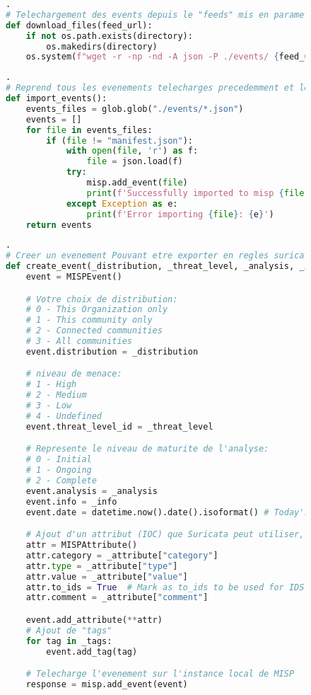 \begin{figure}[h]%
    \center%
\begin{lstlisting}[language=Python].
# Telechargement des events depuis le "feeds" mis en parametre dans un dossier local
def download_files(feed_url):
    if not os.path.exists(directory):
        os.makedirs(directory)
    os.system(f"wget -r -np -nd -A json -P ./events/ {feed_url}")
\end{lstlisting}
\end{figure}

\begin{figure}[h]%
    \center%
\begin{lstlisting}[language=Python].
# Reprend tous les evenements telecharges precedemment et les integre dans l'instance locale de MISP.
def import_events():
    events_files = glob.glob("./events/*.json")
    events = []
    for file in events_files:
        if (file != "manifest.json"):
            with open(file, 'r') as f:
                file = json.load(f)
            try:
                misp.add_event(file)
                print(f'Successfully imported to misp {file}')
            except Exception as e:
                print(f'Error importing {file}: {e}')
    return events
\end{lstlisting}
\end{figure}

\newpage

\begin{figure}[h]%
    \center%
\begin{lstlisting}[language=Python].
# Creer un evenement Pouvant etre exporter en regles suricata
def create_event(_distribution, _threat_level, _analysis, _info, _attribute, _tags):
    event = MISPEvent()

    # Votre choix de distribution:
    # 0 - This Organization only
    # 1 - This community only
    # 2 - Connected communities
    # 3 - All communities
    event.distribution = _distribution

    # niveau de menace:
    # 1 - High
    # 2 - Medium
    # 3 - Low
    # 4 - Undefined
    event.threat_level_id = _threat_level

    # Represente le niveau de maturite de l'analyse:
    # 0 - Initial
    # 1 - Ongoing
    # 2 - Complete
    event.analysis = _analysis
    event.info = _info
    event.date = datetime.now().date().isoformat() # Today's date

    # Ajout d'un attribut (IOC) que Suricata peut utiliser, tel qu'un domaine
    attr = MISPAttribute()
    attr.category = _attribute["category"]
    attr.type = _attribute["type"]
    attr.value = _attribute["value"]
    attr.to_ids = True  # Mark as to_ids to be used for IDS export
    attr.comment = _attribute["comment"]

    event.add_attribute(**attr)
    # Ajout de "tags"
    for tag in _tags:
        event.add_tag(tag)

    # Telecharge l'evenement sur l'instance local de MISP
    response = misp.add_event(event)
\end{lstlisting}
\end{figure}